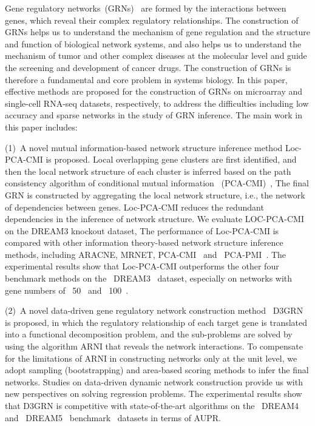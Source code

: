 \begin{abstracten}

Gene regulatory networks~(GRNs)~ are formed by the interactions between genes, 
which reveal their complex regulatory relationships. 
The construction of GRNs helps us to understand the mechanism of gene regulation and the structure and function of biological network systems, 
and also helps us to understand the mechanism of tumor and other complex diseases at the molecular level and guide the screening and development of cancer drugs. 
The construction of GRNs is therefore a fundamental and core problem in systems biology. 
In this paper, effective methods are proposed for the construction of GRNs on microarray and single-cell RNA-seq datasets, respectively, 
to address the difficulties including low accuracy and sparse networks in the study of GRN inference.
The main work in this paper includes:

(1)~A novel mutual information-based network structure inference method Loc-PCA-CMI is proposed.
Local overlapping gene clusters are first identified, and then the local network structure of each cluster is inferred based on the path consistency algorithm of conditional mutual information ~(PCA-CMI)~,
The final GRN is constructed by aggregating the local network structure, i.e., the network of dependencies between genes.
Loc-PCA-CMI reduces the redundant dependencies in the inference of network structure.
We evaluate LOC-PCA-CMI on the DREAM3 knockout dataset,
The performance of Loc-PCA-CMI is compared with other information theory-based network structure inference methods, including ARACNE, MRNET, PCA-CMI~ and ~PCA-PMI~.
The experimental results show that Loc-PCA-CMI outperforms the other four benchmark methods on the ~DREAM3~ dataset, especially on networks with gene numbers of ~50~ and ~100~.

(2)~A novel data-driven gene regulatory network construction method ~D3GRN is proposed, in which the regulatory relationship of each target gene is translated into a functional decomposition problem, 
and the sub-problems are solved by using the algorithm ARNI that reveals the network interactions. 
To compensate for the limitations of ARNI in constructing networks only at the unit level, 
we adopt sampling (bootstrapping) and area-based scoring methods to infer the final networks. 
Studies on data-driven dynamic network construction provide us with new perspectives on solving regression problems. 
The experimental results show that D3GRN is competitive with state-of-the-art algorithms on the ~DREAM4~ and ~DREAM5~ benchmark~ datasets in terms of AUPR.


\end{abstracten}
